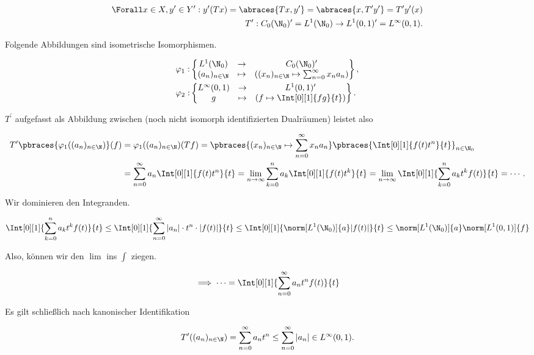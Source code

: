 \begin{solution}
\begin{align*}
  \Forall x \in X, y^\prime \in Y^\prime:
  y^\prime(T x)
  =
  \abraces{T x, y^\prime}
  =
  \abraces{x, T^\prime y^\prime}
  =
  T^\prime y^\prime(x) \\
  \quad
  T^\prime:
  C_0(\N_0)^\prime = L^1(\N_0)
  \to
  L^1(0, 1)^\prime = L^\infty(0, 1).
\end{align*}

Folgende Abbildungen sind isometrische Isomorphismen.

\begin{align*}
  \varphi_1:
  &
  \begin{Bmatrix}
    L^1(\N_0)        & \to     & C_0(\N_0)^\prime \\
    (a_n)_{n \in \N} & \mapsto &
    ((x_n)_{n \in \N} \mapsto \sum_{n=0}^\infty x_n a_n)
  \end{Bmatrix}, \\
  \varphi_2:
  &
  \begin{Bmatrix}
    L^\infty(0, 1) & \to    & L^1(0, 1)^\prime \\
    g              &\mapsto & (f \mapsto \Int[0][1]{fg}{t})
  \end{Bmatrix}.
\end{align*}

$T^\prime$ aufgefasst als Abbildung zwischen (noch nicht isomorph identifizierten Dualräumen) leistet also

\begin{align*}
  T^\prime \pbraces
  {
    \varphi_1((a_n)_{n \in \N})
  }(f)
  & =
  \varphi_1((a_n)_{n \in \N})(T f)
  =
  \pbraces{(x_n)_{n \in \N} \mapsto \sum_{n=0}^\infty x_n a_n}
  \pbraces{\Int[0][1]{f(t) t^n}{t}}_{n \in \N_0} \\
  & =
  \sum_{n=0}^\infty a_n
  \Int[0][1]{f(t) t^n}{t}
  =
  \lim_{n \to \infty} \sum_{k= 0}^n a_k
  \Int[0][1]{f(t) t^k}{t}
  =
  \lim_{n \to \infty}
  \Int[0][1]{\sum_{k=0}^n a_k t^k f(t)}{t} = \cdots.
\end{align*}

Wir dominieren den Integranden.

\begin{align*}
  \Int[0][1]{\sum_{k=0}^n a_k t^k f(t)}{t}
  \leq
  \Int[0][1]{\sum_{n=0}^\infty |a_n| \cdot t^n \cdot |f(t)|}{t}
  \leq
  \Int[0][1]{\norm[L^1(\N_0)]{a} |f(t)|}{t}
  \leq
  \norm[L^1(\N_0)]{a} \norm[L^1(0, 1)]{f}
\end{align*}

Also, können wir den $\lim$ ins $\int$ ziegen.

\begin{align*}
  \implies
  \cdots
  =
  \Int[0][1]{\sum_{n=0}^\infty a_n t^n f(t)}{t}
\end{align*}

Es gilt schließlich nach kanonischer Identifikation

\begin{align*}
  T^\prime((a_n)_{n \in \N})
  =
  \sum_{n=0}^\infty a_n t^n
  \leq
  \sum_{n=0}^\infty |a_n|
  \in
  L^\infty(0, 1).
\end{align*}

\end{solution}

